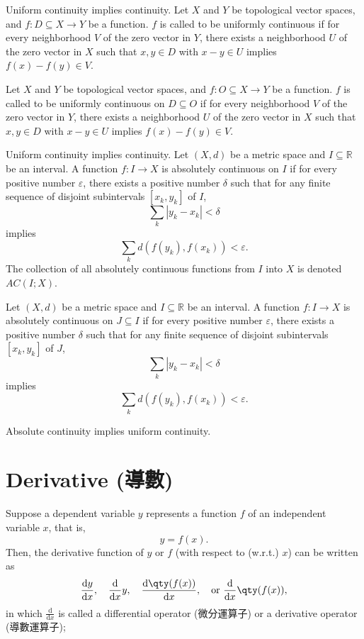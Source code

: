\documentclass[a4paper,12pt]{report}
\begin{document}
\begin{itemize}
\begin{itemize}
Uniform continuity implies continuity.
Let $X$ and $Y$ be topological vector spaces, and $f\colon D\subseteq X\to Y$ be a function. $f$ is called to be uniformly continuous if for every neighborhood $V$ of the zero vector in $Y$, there exists a neighborhood $U$ of the zero vector in $X$ such that $x,y\in D$ with $x-y\in U$ implies $f(x)-f(y)\in V$.

Let $X$ and $Y$ be topological vector spaces, and $f\colon O\subseteq X\to Y$ be a function. $f$ is called to be uniformly continuous on $D\subseteq O$ if for every neighborhood $V$ of the zero vector in $Y$, there exists a neighborhood $U$ of the zero vector in $X$ such that $x,y\in D$ with $x-y\in U$ implies $f(x)-f(y)\in V$.

Uniform continuity implies continuity.
Let $(X, d)$ be a metric space and $I\subseteq\mathbb{R}$ be an interval. A function $f\colon I \to X$ is absolutely continuous on $I$ if for every positive number $\varepsilon$, there exists a positive number $\delta$ such that for any finite sequence of disjoint subintervals $[x_k, y_k]$ of $I$,
\[\sum _{k}\left|y_{k}-x_{k}\right|<\delta\]
implies
\[\sum _{k}d\left(f(y_{k}),f(x_{k})\right)<\varepsilon.\]
The collection of all absolutely continuous functions from $I$ into $X$ is denoted $AC(I; X)$.

Let $(X, d)$ be a metric space and $I\subseteq\mathbb{R}$ be an interval. A function $f\colon I \to X$ is absolutely continuous on $J\subseteq I$ if for every positive number $\varepsilon$, there exists a positive number $\delta$ such that for any finite sequence of disjoint subintervals $[x_k, y_k]$ of $J$,
\[\sum _{k}\left|y_{k}-x_{k}\right|<\delta\]
implies
\[\sum _{k}d\left(f(y_{k}),f(x_{k})\right)<\varepsilon.\]

Absolute continuity implies uniform continuity.



\section{Derivative (導數)}
Suppose a dependent variable $y$ represents a function $f$ of an independent variable $x$, that is,
\[y=f(x).\]
Then, the derivative function of $y$ or $f$ (with respect to (w.r.t.) $x$) can be written as
\[\frac{\mathrm{d}y}{\mathrm{d}x},\quad\frac{\mathrm{d}}{\mathrm{d}x}y,\quad\frac{\mathrm{d}\qty(f(x))}{\mathrm{d}x},\quad\text{or\ }\frac{\mathrm{d}}{\mathrm{d}x}\qty(f(x)),\]
in which $\frac{\mathrm{d}}{\mathrm{d}x}$ is called a differential operator (微分運算子) or a derivative operator (導數運算子);


\end{itemize}
\end{itemize}
\end{document}
